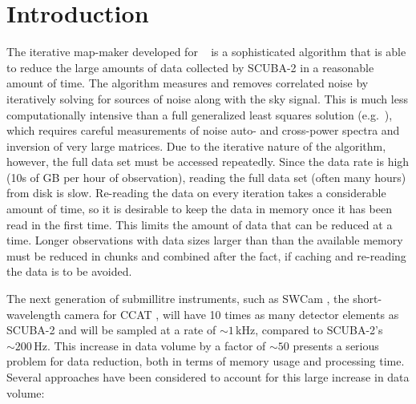 \documentclass[oneside,11pt]{starlink}
\begin{document}
\scfrontmatter

\section{Introduction\label{se:intro}}

The iterative map-maker developed for \SMURF\ \cite{smurf} is a sophisticated
algorithm that is able to reduce the large amounts of data collected
by SCUBA-2 in a reasonable amount of time. The algorithm measures and
removes correlated noise by iteratively solving for sources of noise
along with the sky signal. This is much less computationally intensive
than a full generalized least squares solution
(e.g.\ \cite{patanchon2008}), which requires careful measurements of
noise auto- and cross-power spectra and inversion of very large
matrices. Due to the iterative nature of the algorithm, however, the
full data set must be accessed repeatedly. Since the data rate is high
(10s of GB per hour of observation), reading the full data set (often
many hours) from disk is slow. Re-reading the data on every iteration
takes a considerable amount of time, so it is desirable to keep the
data in memory once it has been read in the first time. This limits
the amount of data that can be reduced at a time. Longer observations
with data sizes larger than than the available memory must be reduced
in chunks and combined after the fact, if caching and re-reading the
data is to be avoided.

The next generation of submillitre instruments, such as SWCam
\cite{stacey2014}, the short-wavelength camera for CCAT
\cite{jenness2014}, will have 10 times as many detector elements as
SCUBA-2 and will be sampled at a rate of ${\sim} 1$\,kHz, compared to
SCUBA-2's ${\sim} 200$\,Hz. This increase in data volume by a factor
of ${\sim} 50$ presents a serious problem for data reduction, both
in terms of memory usage and processing time. Several approaches have
been considered to account for this large increase in data volume:
\end{document}
